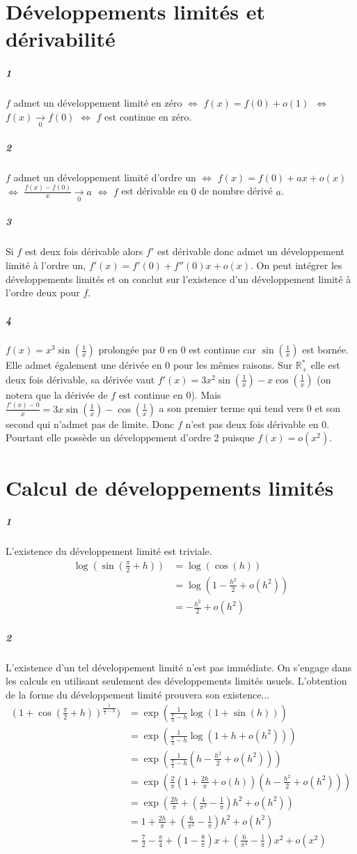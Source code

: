 \documentclass[10pt,a4paper]{article}
\newcommand{\al}[1]{\begin{aligned} #1 \end{aligned}}
\begin{document}
\section{Développements limités et dérivabilité}
\subparagraph{1}$f$ admet un développement limité en zéro $\Leftrightarrow$ $f(x) = f(0) + o(1)$~$\Leftrightarrow$~$f(x) \underset{0}{\rightarrow} f(0)$ $\Leftrightarrow$ $f$ est continue en zéro.
\subparagraph{2}$f$ admet un développement limité d'ordre un $\Leftrightarrow$ $f(x) = f(0) + ax + o(x)$ $\Leftrightarrow$ $\frac{f(x)-f(0)}{x} \underset{0}{\rightarrow} a$ $\Leftrightarrow$ $f$ est dérivable en $0$ de nombre dérivé $a$.
\subparagraph{3}Si $f$ est deux fois dérivable alors $f'$ est dérivable donc admet un développement limité à l'ordre un, $f'(x) = f'(0) + f''(0)x + o(x)$. On peut intégrer les développements limités et on conclut sur l'existence d'un développement limité à l'ordre deux pour $f$.
\subparagraph{4}$f(x) = x^3\sin(\frac{1}{x})$ prolongée par $0$ en 0 est continue car $\sin(\frac{1}{x})$ est bornée. Elle admet également une dérivée en $0$ pour les mêmes raisons. Sur $\mathbb{R}_+^*$ elle est deux fois dérivable, sa dérivée vaut $f'(x) = 3x^2\sin(\frac{1}{x}) - x\cos(\frac{1}{x})$ (on notera que la dérivée de $f$ est continue en $0$). Mais $\frac{f'(x) - 0}{x} = 3x\sin(\frac{1}{x}) - \cos(\frac{1}{x})$ a son premier terme qui tend vers 0 et son second qui n'admet pas de limite. Donc $f$ n'est pas deux fois dérivable en $0$. Pourtant elle possède un développement d'ordre 2 puisque $f(x) = o(x^2)$.

\section{Calcul de développements limités}

\subparagraph{1}L'existence du développement limité est triviale.
\[
\al{
\log(\sin(\frac{\pi}{2}+h)) &= \log(\cos(h)) \\
&= \log( 1- \frac{h^2}{2} + o(h^2)) \\
&=-\frac{h^2}{2}+o(h^2)
}
\]

\subparagraph{2}L'existence d'un tel développement limité n'est pas immédiate. On s'engage dans les calculs en utilisant seulement des développements limités usuels. L'obtention de la forme du développement limité prouvera son existence...
\[
\al{
\left(1 + \cos(\frac{\pi}{2}+h) \right)^{\frac{1}{\frac{\pi}{2}-h}}) &= \exp\left( \frac{1}{\frac{\pi}{2}-h} \log(1+\sin(h)) \right) \\
&= \exp\left( \frac{1}{\frac{\pi}{2}-h} \log(1+h + o(h^2)) \right) \\
&= \exp\left( \frac{1}{\frac{\pi}{2}-h} (h - \frac{h^2}{2} +o(h^2)) \right) \\
&= \exp\left( \frac{2}{\pi}(1 + \frac{2h}{\pi} + o(h)) (h - \frac{h^2}{2} +o(h^2)) \right) \\
&=\exp \left( \frac{2h}{\pi} +(\frac{4}{\pi^2} - \frac{1}{\pi})h^2 + o(h^2)\right) \\
&=1+\frac{2h}{\pi} + (\frac{6}{\pi^2}- \frac{1}{\pi})h^2 + o(h^2) \\
&=\frac{7}{2} - \frac{\pi}{4} + (1- \frac{8}{\pi})x + (\frac{6}{\pi^2} - \frac{1}{\pi})x^2 + o(x^2)
}
\]
\end{document}
